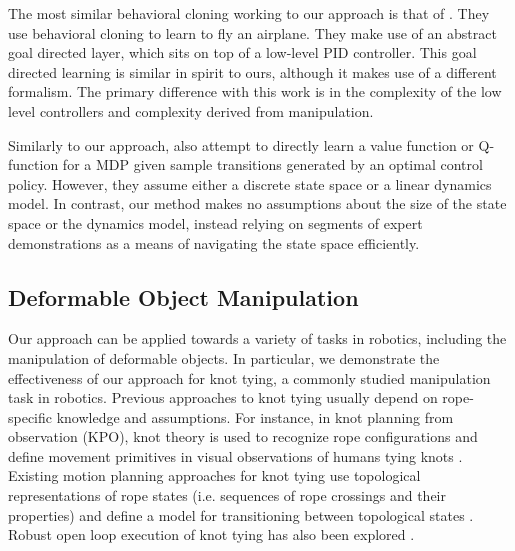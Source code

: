 The most similar behavioral cloning working to our approach is that of \citet{Isaac_ICML2003}.
They use behavioral cloning to learn to fly an airplane.
They make use of an abstract goal directed layer, which sits on top of a low-level PID controller.
This goal directed learning is similar in spirit to ours, although it makes use of a different formalism.
The primary difference with this work is in the complexity of the low level controllers and complexity derived from manipulation.

Similarly to our approach, \citet{Dvijotham_ICML2010} also attempt to directly
learn a value function or Q-function for a MDP given sample transitions
generated by an optimal control policy. However, they assume either a discrete
state space or a linear dynamics model. In contrast, our method makes no
assumptions about the size of the state space or the dynamics model, instead
relying on segments of expert demonstrations as a means of navigating the state
space efficiently. 

\subsection{Deformable Object Manipulation}
Our approach can be applied towards a variety of tasks in robotics,
including the manipulation of deformable objects.
In particular, we demonstrate the effectiveness of our approach for
knot tying, a commonly studied manipulation task in robotics.
Previous approaches to knot tying usually depend on rope-specific knowledge
and assumptions.
For instance, in knot planning from observation (KPO), knot theory is used
to recognize rope configurations and define movement primitives in visual
observations of humans tying knots \cite{Morita_ICRA2003, Takamatsu_TransRob2006}.
Existing motion planning approaches for knot tying use topological
representations of rope states (i.e. sequences of rope crossings and their
properties) and define a model for transitioning between topological states
\cite{Saha_ExpRobotics2008, Wakamatsu_IJRR2006}.
Robust open loop execution of knot tying has also been explored \cite{Bell_PhD2010}.
